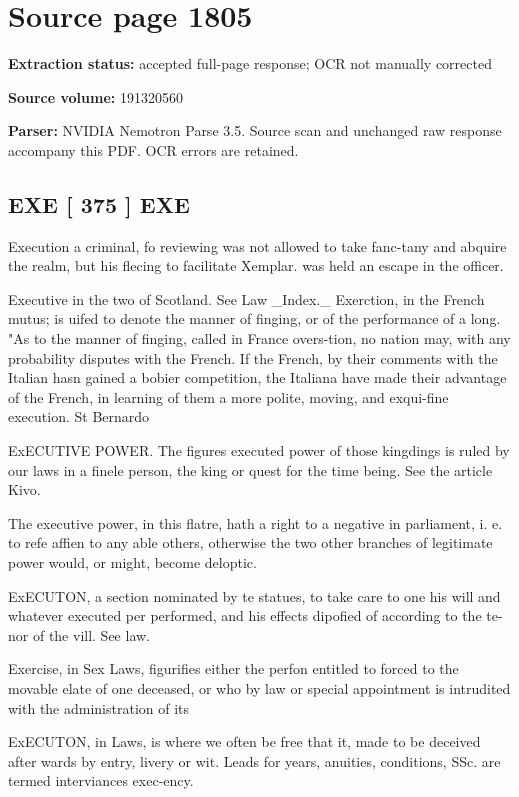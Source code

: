 \clearpage
\section{Source page 1805}
\textbf{Extraction status:} accepted full-page response; OCR not manually corrected\par
\textbf{Source volume:} 191320560\par
\textbf{Parser:} NVIDIA Nemotron Parse 3.5. Source scan and unchanged raw response accompany this PDF. OCR errors are retained.\par\medskip
\subsection*{EXE [ 375 ] EXE}
Execution a criminal, fo reviewing was not allowed to take fanc-tany and abquire the realm, but his flecing to facilitate Xemplar. was held an escape in the officer.\par\medskip
Executive in the two of Scotland. See Law \_Index.\_ Exerction, in the French mutus; is uifed to denote the manner of finging, or of the performance of a long. "As to the manner of finging, called in France overs-tion, no nation may, with any probability disputes with the French. If the French, by their comments with the Italian hasn gained a bobier competition, the Italiana have made their advantage of the French, in learning of them a more polite, moving, and exqui-fine execution. St Bernardo\par\medskip
ExECUTIVE POWER. The figures executed power of those kingdings is ruled by our laws in a finele person, the king or quest for the time being. See the article Kivo.\par\medskip
The executive power, in this flatre, hath a right to a negative in parliament, i. e. to refe affien to any able others, otherwise the two other branches of legitimate power would, or might, become deloptic.\par\medskip
ExECUTON, a section nominated by te statues, to take care to one his will and whatever executed per performed, and his effects dipofied of according to the te-nor of the vill. See law.\par\medskip
Exercise, in Sex Laws, figurifies either the perfon entitled to forced to the movable elate of one deceased, or who by law or special appointment is intrudited with the administration of its\par\medskip
ExECUTON, in Laws, is where we often be free that it, made to be deceived after wards by entry, livery or wit. Leads for years, anuities, conditions, SSc. are termed interviances exec-ency.\par\medskip
